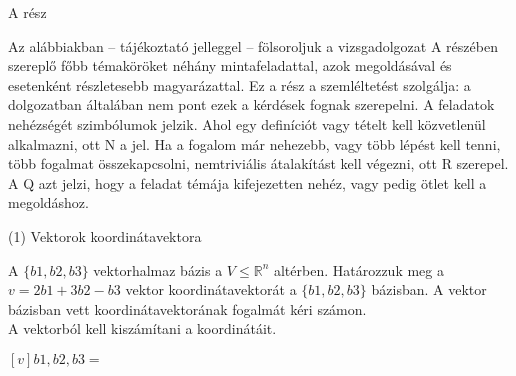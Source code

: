 

\begin{frame}[plain]
\begin{tcolorbox}[center, colback={myyellow}, coltext={black}, colframe={myyellow}]
    {\RHuge  A rész}
    \mmedskip
\end{tcolorbox}
\end{frame}

\begin{frame}
  \begin{tcolorbox}[title={2. (4p)}]
Az alábbiakban – tájékoztató jelleggel – fölsoroljuk a vizsgadolgozat A részében szereplő főbb témaköröket néhány mintafeladattal, azok megoldásával és esetenként részletesebb magyarázattal. Ez a rész a szemléltetést szolgálja: a dolgozatban általában nem pont ezek a kérdések fognak szerepelni. A feladatok nehézségét szimbólumok jelzik. Ahol egy deﬁníciót vagy tételt kell közvetlenül alkalmazni, ott N a jel. Ha a fogalom már nehezebb, vagy több lépést kell tenni, több fogalmat összekapcsolni, nemtriviális átalakítást kell végezni, ott R szerepel. A Q azt jelzi, hogy a feladat témája kifejezetten nehéz, vagy pedig ötlet kell a megoldáshoz.
  \end{tcolorbox}
\end{frame}

\begin{frame}[plain]
\begin{tcolorbox}[center, colback={myyellow}, coltext={black}, colframe={myyellow}]
    {\RHuge  (1) Vektorok koordinátavektora}
    \mmedskip
\end{tcolorbox}
\end{frame}

\begin{frame}
  \begin{tcolorbox}[title={1/1. -N-}]
      A $\{b1,b2,b3\}$ vektorhalmaz bázis a $V ≤ \mathbb{R}^n$ altérben. Határozzuk meg a $v = 2b1 + 3b2 −b3$ vektor koordinátavektorát a $\{b1,b2,b3\}$ bázisban.
  \tcblower
    A vektor bázisban vett koordinátavektorának fogalmát kéri számon.\\
    
    A vektorból kell kiszámítani a koordinátáit.\\
    \mmedskip 
  
   $[v]b1,b2,b3 =$ 
  \end{tcolorbox}
\end{frame}

